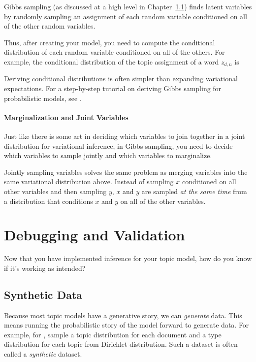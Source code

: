 Gibbs sampling (as discussed at a high level in Chapter~\ref{}) finds
latent variables by randomly sampling an assignment of each random
variable conditioned on all of the other random variables.

Thus, after creating your model, you need to compute the conditional
distribution of each random variable conditioned on all of the
others.  For example, the conditional distribution of the topic
assignment of a word $z_{d,n}$ is
\begin{equation}

\end{equation}

Deriving conditional distributions is often simpler than expanding
variational expectations.  For a step-by-step tutorial on deriving
Gibbs sampling for probabilistic models, see \citet{}.

\paragraph{Marginalization and Joint Variables}

Just like there is some art in deciding which variables to join
together in a joint distribution for variational inference, in Gibbs
sampling, you need to decide which variables to sample jointly and
which variables to marginalize.

Jointly sampling variables solves the same problem as merging
variables into the same variational distribution above.  Instead of
sampling $x$ conditioned on all other variables and then sampling $y$,
$x$ and $y$ are sampled \emph{at the same time} from a distribution
that conditions $x$ and $y$ on all of the other variables.

\section{Debugging and Validation}

Now that you have implemented inference for your topic model, how do
you know if it's working as intended?

\subsection{Synthetic Data}

Because most topic models have a generative story, we can
\emph{generate} data.  This means running the probabilistic story of
the model forward to generate data.  For example, for ,
sample a topic distribution for each document and a type distribution
for each topic from Dirichlet distribution.  Such a dataset is often
called a \emph{synthetic} dataset.


